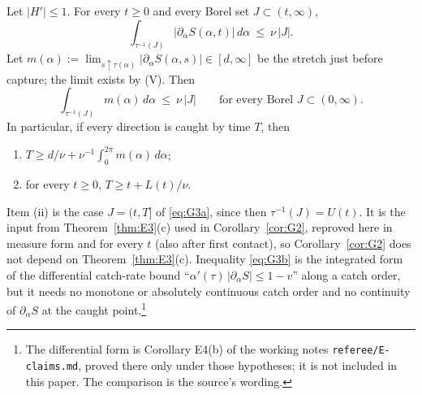 \begin{theorem}\label{thm:G3}
Let $|H'|\le1$. For every $t\ge0$ and every Borel set $J\subset(t,\infty)$,
\begin{equation}\label{eq:G3a}
\int_{\tau^{-1}(J)}|\partial_\alpha S(\alpha,t)|\,d\alpha\ \le\ \nu\,|J| .
\end{equation}
Let $m(\alpha):=\lim_{s\uparrow\tau(\alpha)}|\partial_\alpha S(\alpha,s)|\in[d,\infty]$ be the stretch just before capture; the limit exists by (V).
Then
\begin{equation}\label{eq:G3b}
\int_{\tau^{-1}(J)}m(\alpha)\,d\alpha\ \le\ \nu\,|J|\qquad\text{for every Borel }J\subset(0,\infty).
\end{equation}
In particular, if every direction is caught by time $T$, then
\begin{enumerate}
\item[(i)] $T\ge d/\nu+\nu^{-1}\int_0^{2\pi}m(\alpha)\,d\alpha$;
\item[(ii)] for every $t\ge0$, $T\ge t+L(t)/\nu$.
\end{enumerate}
\end{theorem}
Item (ii) is the case $J=(t,T]$ of \eqref{eq:G3a}, since then $\tau^{-1}(J)=U(t)$. It is the input from Theorem~\ref{thm:E3}(c)
used in Corollary~\ref{cor:G2}, reproved here in measure form and for every $t$ (also after first contact), so
Corollary~\ref{cor:G2} does not depend on Theorem~\ref{thm:E3}(c). Inequality \eqref{eq:G3b} is the integrated form of the
differential catch-rate bound ``$\alpha'(\tau)\,|\partial_\alpha S|\le1-v$'' along a catch order, but it needs no monotone or absolutely
continuous catch order and no continuity of $\partial_\alpha S$ at the caught point.\footnote{The differential form is Corollary E4(b) of
the working notes \texttt{referee/E-claims.md}, proved there only under those hypotheses; it is not included in this paper.
The comparison is the source's wording.}

